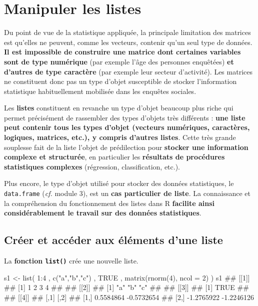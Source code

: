 \documentclass[12pt,twosided, notitlepage]{book}
\newenvironment{Shaded}{}{}
\newcommand{\KeywordTok}[1]{\textcolor[rgb]{0.00,0.00,1.00}{{#1}}}
\newcommand{\DataTypeTok}[1]{{#1}}
\newcommand{\DecValTok}[1]{{#1}}
\newcommand{\StringTok}[1]{\textcolor[rgb]{0.00,0.50,0.50}{{#1}}}
\newcommand{\OtherTok}[1]{\textcolor[rgb]{1.00,0.25,0.00}{{#1}}}
\newcommand{\NormalTok}[1]{{#1}}
\renewenvironment{Shaded}{\begin{snugshade}}{\end{snugshade}}
\begin{document}
\section{Manipuler les listes}\label{manipuler-les-listes}

Du point de vue de la statistique appliquée, la principale limitation
des matrices est qu'elles ne peuvent, comme les vecteurs, contenir qu'un
seul type de données. \textbf{Il est impossible de construire une
matrice dont certaines variables sont de type numérique} (par exemple
l'âge des personnes enquêtées) \textbf{et d'autres de type caractère}
(par exemple leur secteur d'activité). Les matrices ne constituent donc
pas un type d'objet susceptible de stocker l'information statistique
habituellement mobilisée dans les enquêtes sociales.

Les \textbf{listes} constituent en revanche un type d'objet beaucoup
plus riche qui permet précisément de rassembler des types d'objets très
différents : \textbf{une liste peut contenir tous les types d'objet
(vecteurs numériques, caractères, logiques, matrices, etc.), y compris
d'autres listes}. Cette très grande souplesse fait de la liste l'objet
de prédilection pour \textbf{stocker une information complexe et
structurée}, en particulier les \textbf{résultats de procédures
statistiques complexes} (régression, classification, etc.).

Plus encore, le type d'objet utilisé pour stocker des données
statistiques, le \texttt{data.frame} (\emph{cf.} module 3), est un
\textbf{cas particulier de liste}. La connaissance et la compréhension
du fonctionnement des listes dans R \textbf{facilite ainsi
considérablement le travail sur des données statistiques}.

\subsection{Créer et accéder aux éléments d'une
liste}\label{creer-et-acceder-aux-elements-dune-liste}

La \textbf{fonction \texttt{list()}} crée
une nouvelle liste.

\begin{Shaded}
\begin{Highlighting}[]
\NormalTok{s1 <-}\StringTok{ }\KeywordTok{list}\NormalTok{(}
  \DecValTok{1}\NormalTok{:}\DecValTok{4}
  \NormalTok{, }\KeywordTok{c}\NormalTok{(}\StringTok{"a"}\NormalTok{,}\StringTok{"b"}\NormalTok{,}\StringTok{"c"}\NormalTok{)}
  \NormalTok{, }\OtherTok{TRUE}
  \NormalTok{, }\KeywordTok{matrix}\NormalTok{(}\KeywordTok{rnorm}\NormalTok{(}\DecValTok{4}\NormalTok{), }\DataTypeTok{ncol =} \DecValTok{2}\NormalTok{)}
\NormalTok{)}
\NormalTok{s1}
  \NormalTok{## [[1]]}
  \NormalTok{## [1] 1 2 3 4}
  \NormalTok{## }
  \NormalTok{## [[2]]}
  \NormalTok{## [1] "a" "b" "c"}
  \NormalTok{## }
  \NormalTok{## [[3]]}
  \NormalTok{## [1] TRUE}
  \NormalTok{## }
  \NormalTok{## [[4]]}
  \NormalTok{##            [,1]       [,2]}
  \NormalTok{## [1,]  0.5584864 -0.5732654}
  \NormalTok{## [2,] -1.2765922 -1.2246126}
\end{Highlighting}
\end{Shaded}
\end{document}
